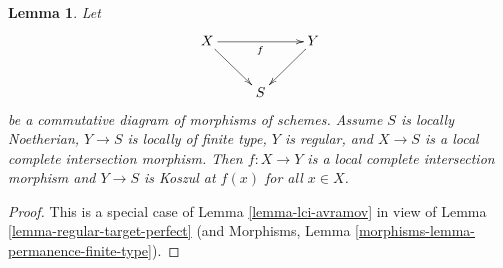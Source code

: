 \documentclass[10pt,a4paper]{amsart}
\theoremstyle{plain}
\newtheorem{lemma}[subsection]{Lemma}
\theoremstyle{definition}
\theoremstyle{remark}
\numberwithin{equation}{subsection}
\begin{document}
\begin{lemma}
\label{lemma-lci-to-regular}
Let
$$
\xymatrix{
X \ar[rr]_f \ar[rd] & & Y \ar[ld] \\
& S
}
$$
be a commutative diagram of morphisms of schemes. Assume
$S$ is locally Noetherian, $Y \to S$ is locally of finite type,
$Y$ is regular, and $X \to S$ is a local complete intersection morphism.
Then $f : X \to Y$ is a local complete intersection morphism
and $Y \to S$ is Koszul at $f(x)$ for all $x \in X$.
\end{lemma}

\begin{proof}
This is a special case of Lemma \ref{lemma-lci-avramov}
in view of Lemma \ref{lemma-regular-target-perfect}
(and Morphisms, Lemma \ref{morphisms-lemma-permanence-finite-type}).
\end{proof}
\end{document}
